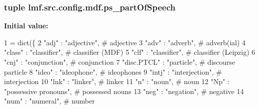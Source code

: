 \hypertarget{namespacelmf_1_1src_1_1config_1_1mdf_a1e76a452fc77f05851e4369134f5980b}{
\subsubsection[{ps\+\_\+part\+Of\+Speech}]{\setlength{\rightskip}{0pt plus 5cm}tuple lmf.\+src.\+config.\+mdf.\+ps\+\_\+part\+Of\+Speech}}\label{namespacelmf_1_1src_1_1config_1_1mdf_a1e76a452fc77f05851e4369134f5980b}
{\bfseries Initial value\+:}
\begin{DoxyCode}
1 = dict(\{
2     \textcolor{stringliteral}{"adj"}       : \textcolor{stringliteral}{"adjective"},                  \textcolor{comment}{# adjective}
3     \textcolor{stringliteral}{"adv"}       : \textcolor{stringliteral}{"adverb"},                     \textcolor{comment}{# adverb(ial)}
4     \textcolor{stringliteral}{"class"}     : \textcolor{stringliteral}{"classifier"},                 \textcolor{comment}{# classifier (MDF)}
5     \textcolor{stringliteral}{"clf"}       : \textcolor{stringliteral}{"classifier"},                 \textcolor{comment}{# classifier (Leipzig)}
6     \textcolor{stringliteral}{"cnj"}       : \textcolor{stringliteral}{"conjunction"},                \textcolor{comment}{# conjunction}
7     \textcolor{stringliteral}{"disc.PTCL"} : \textcolor{stringliteral}{"particle"},                   \textcolor{comment}{# discourse particle}
8     \textcolor{stringliteral}{"ideo"}      : \textcolor{stringliteral}{"ideophone"},                  \textcolor{comment}{# ideophones}
9     \textcolor{stringliteral}{"intj"}      : \textcolor{stringliteral}{"interjection"},               \textcolor{comment}{# interjection}
10     \textcolor{stringliteral}{"lnk"}       : \textcolor{stringliteral}{"linker"},                     \textcolor{comment}{# linker}
11     \textcolor{stringliteral}{"n"}         : \textcolor{stringliteral}{"noun"},                       \textcolor{comment}{# noun}
12     \textcolor{stringliteral}{"Np"}        : \textcolor{stringliteral}{"possessive pronouns"},        \textcolor{comment}{# possessed nouns}
13     \textcolor{stringliteral}{"neg"}       : \textcolor{stringliteral}{"negation"},                   \textcolor{comment}{# negative}
14     \textcolor{stringliteral}{"num"}       : \textcolor{stringliteral}{"numeral"},                    \textcolor{comment}{# number}

\end{DoxyCode}
